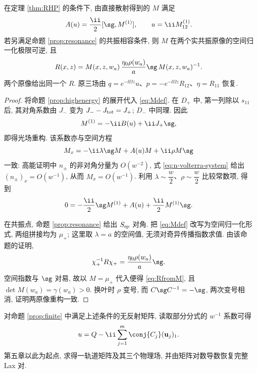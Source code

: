 \begin{proposition}[三场重构恒等式]\label{prop:reconstruction}
在定理 \ref{thm:RHP} 的条件下, 由直接散射得到的 $M$ 满足
\begin{equation}\label{eq:reconq}
A(u)=\dfrac{\ii}{2}[\sg,M^{(1)}],\qquad u=\ii M^{(1)}_{12}.
\end{equation}
若另满足命题 \ref{prop:resonance} 的共振相容条件, 则 $M$ 在两个实共振原像的空间归一化极限可逆, 且
\begin{equation}\label{eq:RfromM}
R(x,z)=M(x,z,w_a)\,
\dfrac{\eta_0\rho(w_a)}{a}\sg\,M(x,z,w_a)^{-1}.
\end{equation}
两个原像给出同一个 $R$. 原三场由
$q=e^{-\ii\Omega z}u$、$p=-e^{-\ii\Omega z}R_{12}$、$\eta=R_{11}$ 恢复.
\end{proposition}
\begin{proof}
将命题 \ref{prop:highenergy} 的展开代入 \eqref{eq:Mdef}. 在 $D_+$ 中, 第一列除以 $s_{11}$ 后, 其对角系数由 $J_-$ 变为 $J_--J_{\rm tot}=J_+$; $D_-$ 中同理. 因此
\[
M^{(1)}=-\ii B(u)+\ii J_+\sg,
\]
即得光场重构. 该系数亦与空间方程
\begin{equation}\label{eq:Mspace}
M_x=-\ii\lambda\sg M+A(u)M+\ii\rho M\sg
\end{equation}
一致: 高能证明中 $n_\pm$ 的非对角分量为 $O(w^{-2})$, 式 \eqref{eq:n-volterra-system} 给出 $(n_\pm)_x=O(w^{-1})$, 从而 $M_x=O(w^{-1})$. 利用 $\lambda\sim\dfrac{w}{2}$、$\rho\sim\dfrac{w}{2}$ 比较常数项, 得到
\[
0=-\dfrac{\ii}{2}\sg M^{(1)}+A(u)+\dfrac{\ii}{2}M^{(1)}\sg.
\]

在共振点, 命题 \ref{prop:resonance} 给出 $S_{\rm sp}$ 对角. 把 \eqref{eq:Mdef} 改写为空间归一化形式, 两组拼接均为 $\mu_+$; 这里取 $\lambda=a$ 的空间值, 无须对奇异传播指数求值. 由该命题的证明,
\[
\chi_+^{-1}R\chi_+=\dfrac{\eta_0\rho(w_a)}{a}\sg.
\]
空间指数与 $\sg$ 对易, 故以 $M=\mu_+$ 代入便得 \eqref{eq:RfromM}, 且 $\det M(w_a)=\gamma(w_a)>0$. 换叶时 $\rho$ 变号, 而 $C\sg C^{-1}=-\sg$, 两次变号相消, 证明两原像重构一致.
\end{proof}

对命题 \ref{prop:finite} 中满足上述条件的无反射矩阵, 读取部分分式的 $w^{-1}$ 系数可得
\begin{equation}\label{eq:qfinite}
u=Q-\ii\sum\limits_{j=1}^{m}\conj{C_j}(\mathbf u_j)_1.
\end{equation}
第五章以此为起点, 求得一轨道矩阵及其三个物理场, 并由矩阵对数导数恢复完整 Lax 对.
